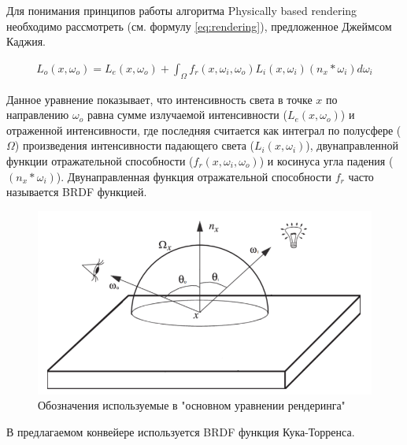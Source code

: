 			Для понимания принципов работы алгоритма Physically based rendering необходимо рассмотреть  (см. формулу \ref{eq:rendering}), предложенное Джеймсом Каджия\cite{kajiya1986rendering}. 
			
			\begin{equation}
				\label{eq:rendering}
				\begin{multlined}
					L_o(x, \omega_o) = L_e(x, \omega_o) + \int_{\Omega} f_r(x, \omega_i, \omega_o)L_i(x, \omega_i)(n_x * \omega_i)d\omega_i
				\end{multlined}
			\end{equation}
			
			Данное уравнение показывает, что интенсивность света в точке $x$ по направлению $\omega_o$ равна сумме излучаемой интенсивности ($L_e(x, \omega_o)$) и отраженной интенсивности, где последняя считается как интеграл по полусфере ($\Omega$) произведения интенсивности падающего света ($L_i(x, \omega_i)$), двунаправленной функции отражательной способности ($f_r(x, \omega_i, \omega_o)$) и косинуса угла падения ($(n_x * \omega_i)$). Двунаправленная функция отражательной способности $f_r$ часто называется BRDF функцией. 
			
			\begin{figure}[ht!] 
				\center
				\includegraphics [scale=0.6] {my_folder/images//rendering_eq}	
				\caption{Обозначения используемые в "основном уравнении рендеринга"} 
				\label{fig:base_rendering}
			\end{figure}
			
			В предлагаемом конвейере используется BRDF функция Кука-Торренса\cite{cook1982reflectance}.
